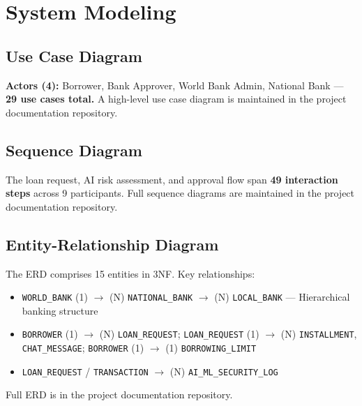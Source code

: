 \documentclass[11pt,a4paper]{article}
\begin{document}
\section{System Modeling}

\subsection{Use Case Diagram}

\textbf{Actors (4):} Borrower, Bank Approver, World Bank Admin, National Bank --- \textbf{29 use cases total.} A high-level use case diagram is maintained in the project documentation repository.

\subsection{Sequence Diagram}

The loan request, AI risk assessment, and approval flow span \textbf{49 interaction steps} across 9 participants. Full sequence diagrams are maintained in the project documentation repository.

\subsection{Entity-Relationship Diagram}

The ERD comprises 15 entities in 3NF. Key relationships:
\begin{itemize}[noitemsep]
\item \texttt{WORLD\_BANK} (1) $\to$ (N) \texttt{NATIONAL\_BANK} $\to$ (N) \texttt{LOCAL\_BANK} --- Hierarchical banking structure
\item \texttt{BORROWER} (1) $\to$ (N) \texttt{LOAN\_REQUEST}; \texttt{LOAN\_REQUEST} (1) $\to$ (N) \texttt{INSTALLMENT}, \texttt{CHAT\_MESSAGE}; \texttt{BORROWER} (1) $\to$ (1) \texttt{BORROWING\_LIMIT}
\item \texttt{LOAN\_REQUEST} / \texttt{TRANSACTION} $\to$ (N) \texttt{AI\_ML\_SECURITY\_LOG}
\end{itemize}

Full ERD is in the project documentation repository.
\end{document}
